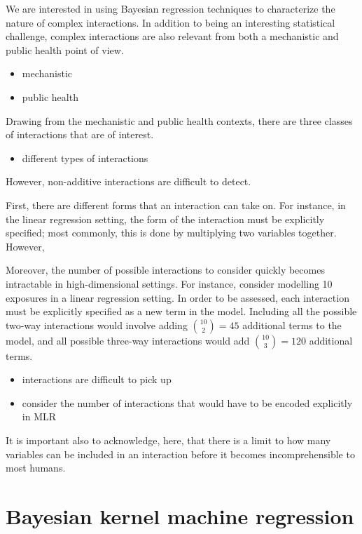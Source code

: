 \documentclass[12pt, twoside]{amherstthesis}
\providecommand{\tightlist}{%
  \setlength{\itemsep}{0pt}\setlength{\parskip}{0pt}}
\begin{document}
We are interested in using Bayesian regression techniques to characterize the nature of complex interactions. In addition to being an interesting statistical challenge, complex interactions are also relevant from both a mechanistic and public health point of view.
\begin{itemize}
\tightlist
\item
  mechanistic
\item
  public health
\end{itemize}
Drawing from the mechanistic and public health contexts, there are three classes of interactions that are of interest.
\begin{itemize}
\tightlist
\item
  different types of interactions
\end{itemize}
However, non-additive interactions are difficult to detect.

First, there are different forms that an interaction can take on. For instance, in the linear regression setting, the form of the interaction must be explicitly specified; most commonly, this is done by multiplying two variables together. However,

Moreover, the number of possible interactions to consider quickly becomes intractable in high-dimensional settings. For instance, consider modelling 10 exposures in a linear regression setting. In order to be assessed, each interaction must be explicitly specified as a new term in the model. Including all the possible two-way interactions would involve adding \({10 \choose 2} = 45\) additional terms to the model, and all possible three-way interactions would add \({10 \choose 3} = 120\) additional terms.
\begin{itemize}
\tightlist
\item
  interactions are difficult to pick up
\item
  consider the number of interactions that would have to be encoded explicitly in MLR
\end{itemize}
It is important also to acknowledge, here, that there is a limit to how many variables can be included in an interaction before it becomes incomprehensible to most humans.

\hypertarget{bayesian-kernel-machine-regression}{%
\section{Bayesian kernel machine regression}\label{bayesian-kernel-machine-regression}}
\end{document}
